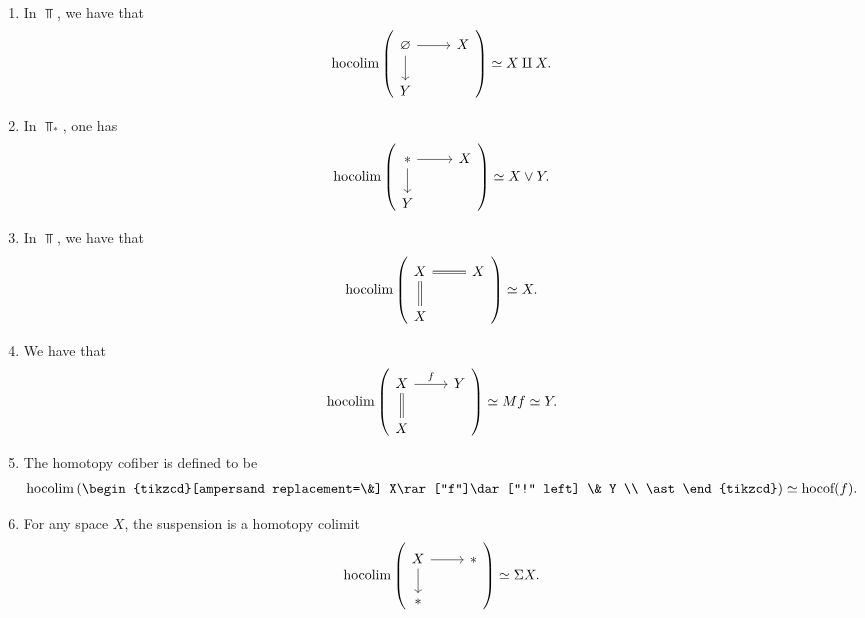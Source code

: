 \documentclass{article}[11pt]
\begin{document}
\begin{examples} $\ $
\begin{enumerate}
	\item In $\Top$, we have that
	\begin{align*}
		\hocolim\left( \begin{tikzcd}[ampersand replacement=\&] \emptyset\rar\dar \& X \\ Y \end{tikzcd} \right) \simeq X \amalg X.
	\end{align*}

	\item In $\Top_\ast$, one has
	\begin{align*}
		\hocolim \left( \begin{tikzcd}[ampersand replacement=\&] \ast\rar\dar \& X \\ Y \end{tikzcd} \right) \simeq X\vee Y.
	\end{align*}

	\item In $\Top$, we have that
	\begin{align*}
		\hocolim \left( \begin{tikzcd}[ampersand replacement=\&] X\rar[equal]\dar[equal] \& X \\ X \end{tikzcd} \right)\simeq X.
	\end{align*}

	\item We have that
	\begin{align*}
		\hocolim \left( \begin{tikzcd}[ampersand replacement=\&] X\rar["f"]\dar[equal] \& Y \\ X \end{tikzcd} \right)\simeq Mf \simeq Y.
	\end{align*}

	\item The homotopy cofiber is defined to be
	\begin{align*}
		\hocolim \left( \begin{tikzcd}[ampersand replacement=\&] X\rar["f"]\dar["!" left] \& Y \\ \ast \end{tikzcd} \right)\simeq \hocof(f).
	\end{align*}

	\item For any space $X$, the suspension is a homotopy colimit
	\begin{align*}
		\hocolim \left( \begin{tikzcd}[ampersand replacement=\&] X\rar\dar \& \ast \\ \ast \end{tikzcd} \right)\simeq \Sigma X.
	\end{align*}


\end{enumerate}
\end{examples}
\end{document}
